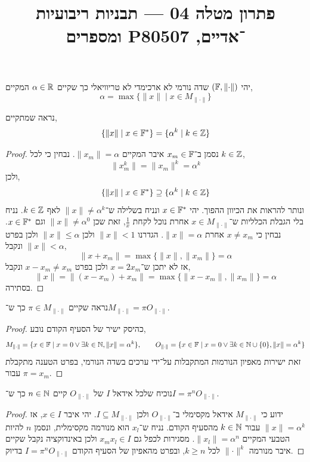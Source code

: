 
\title{פתרון מטלה 04 --- תבניות ריבועיות ומספרים P־אדיים, 80507}

\DeclareMathOperator{\Deg}{Deg}



\maketitle
\maketitleprint[red]

\question{}
יהי $(\mathbb{F}, \lVert \cdot \rVert)$ שדה נורמי לא ארכימדי לא טריוויאלי כך שקיים $\alpha \in \mathbb{R}$ המקיים,
\[
	\alpha = \max\{ \lVert x \rVert \mid x \in M_{\lVert \cdot \rVert} \}
\]

\subquestion{}
נראה שמתקיים,
\[
	\{ \lVert x \rVert \mid x \in \mathbb{F}^* \}
	= \{ \alpha^k \mid k \in \mathbb{Z} \}
\]
\begin{proof}
	נסמן ב־$x_m \in \mathbb{F}$ איבר המקיים $\lVert x_m \rVert = \alpha$.
	נבחין כי לכל $k \in \mathbb{Z}$,
	\[
		\lVert x_m^k \rVert
		= \lVert x_m \rVert^k
		= \alpha^k
	\]
	ולכן,
	\[
		\{ \lVert x \rVert \mid x \in \mathbb{F}^* \}
		\supseteq \{ \alpha^k \mid k \in \mathbb{Z} \}
	\]
	ונותר להראות את הכיוון ההפוך.
	יהי $x \in \mathbb{F}^*$ ונניח בשלילה ש־$\lVert x \rVert \ne \alpha^k$ לאף $k \in \mathbb{Z}$.
	נניח בלי הגבלת הכלליות ש־$x \in M_{\lVert \cdot \rVert}$ אחרת נוכל לקחת $\frac{1}{x}$, זאת שכן $\lVert x \rVert \ne \alpha^0$ וגם $x \in \mathbb{F}^*$.
	נבחין כי $x \ne x_m$ אחרת $\lVert x \rVert = \alpha$.
	הגדרנו $\lVert x \rVert < 1$ ולכן $\lVert x \rVert \le \alpha$ ולכן בפרט $\lVert x \rVert < \alpha$ ונקבל,
	\[
		\lVert x + x_m \rVert
		= \max\{ \lVert x \rVert, \lVert x_m \rVert \}
		= \alpha
	\]
	אז לא יתכן ש־$x = 2 x_m$ ולכן בפרט $x - x_m \ne x_m$ ונקבל,
	\[
		\lVert x \rVert
		= \lVert (x - x_m) + x_m \rVert
		= \max\{ \lVert x - x_m \rVert, \lVert x_m \rVert \}
		= \alpha
	\]
	בסתירה.
\end{proof}

\subquestion{}
נראה שקיים $\pi \in M_{\lVert \cdot \rVert}$ כך ש־$M_{\lVert \cdot \rVert} = \pi O_{\lVert \cdot \rVert}$.
\begin{proof}
	כהיסק ישיר של הסעיף הקודם נובע,
	\[
		M_{\lVert \cdot \rVert}
		= \{ x \in \mathbb{F} \mid x = 0 \lor \exists k \in \mathbb{N}, \lVert x \rVert = \alpha^k \},
		\qquad
		O_{\lVert \cdot \rVert}
		= \{ x \in \mathbb{F} \mid x = 0 \lor \exists k \in \mathbb{N} \cup \{ 0 \}, \lVert x \rVert = \alpha^k \}
	\]
	זאת ישירות מאפיון הנורמות המתקבלות על־ידי ערכים בשדה הנורמי, בפרט הטענה מתקבלת עבור $\pi = x_m$.
\end{proof}

\subquestion{}
נוכיח שלכל אידאל $I$ של $O_{\lVert \cdot \rVert}$ קיים $n \in \mathbb{N}$ כך ש־$I = \pi^n O_{\lVert \cdot \rVert}$.
\begin{proof}
	ידוע כי $M_{\lVert \cdot \rVert}$ אידאל מקסימלי ב־$O_{\lVert \cdot \rVert}$ ולכן $I \subseteq M_{\lVert \cdot \rVert}$.
	יהי איבר $x \in I$, אז $\lVert x \rVert = \alpha^k$ עבור $k \in \mathbb{N}$ מהסעיף הקודם.
	נניח ש־$x_l$ הוא מנורמה מקסימלית, ונסמן $n$ להיות הטבעי המקיים $\lVert x_l \rVert = \alpha^n$.
	מסגירות לכפל גם $x_m x_l \in I$ ולכן באינדוקציה נקבל שקיים איבר מנורמה $\lVert \cdot \rVert^k$ לכל $k \ge n$, ובפרט מהאפיון של הסעיף הקודם $I = \pi^n O_{\lVert \cdot \rVert}$ בדיוק.
\end{proof}

